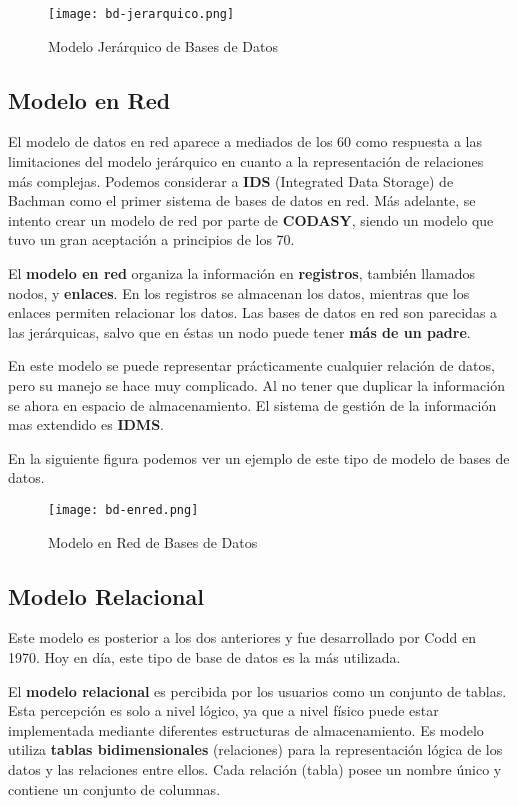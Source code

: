 \begin{figure}[ht]
    \centering
    \texttt{[image: bd-jerarquico.png]}
    \caption{Modelo Jerárquico de Bases de Datos}
\end{figure}

\subsection{Modelo en Red}
El modelo de datos en red aparece a mediados de los 60 como respuesta a las limitaciones del modelo jerárquico en cuanto a la representación de relaciones más complejas. Podemos considerar a \textbf{IDS} (Integrated Data Storage) de Bachman como el primer sistema de bases de datos en red. Más adelante, se intento crear un modelo de red por parte de \textbf{\gls{CODASY}}, siendo un modelo que tuvo un gran aceptación a principios de los 70.

El \textbf{modelo en red} organiza la información en \textbf{registros}, también llamados nodos, y \textbf{enlaces}. En los registros se almacenan los datos, mientras que los enlaces permiten relacionar los datos. Las bases de datos en red son parecidas a las jerárquicas, salvo que en éstas un nodo puede tener \textbf{más de un padre}.

En este modelo se puede representar prácticamente cualquier relación de datos, pero su manejo se hace muy complicado. Al no tener que duplicar la información  se ahora en espacio de almacenamiento. El sistema de gestión de la información mas extendido es \textbf{\gls{IDMS}}.

En la siguiente figura podemos ver un ejemplo de este tipo de modelo de bases de datos.

\begin{figure}[ht]
    \centering
    \texttt{[image: bd-enred.png]}
    \caption{Modelo en Red de Bases de Datos}
\end{figure}

\subsection{Modelo Relacional}
Este modelo es posterior a los dos anteriores y fue desarrollado por Codd en 1970. Hoy en día, este tipo de base de datos es la más utilizada.

El \textbf{modelo relacional} es percibida por los usuarios como un conjunto de tablas. Esta percepción es solo a nivel lógico, ya que a nivel físico puede estar implementada mediante diferentes estructuras de almacenamiento. Es modelo utiliza \textbf{tablas bidimensionales} (relaciones) para la representación lógica de los datos y las relaciones entre ellos. Cada relación (tabla) posee un nombre único y contiene un conjunto de columnas.

